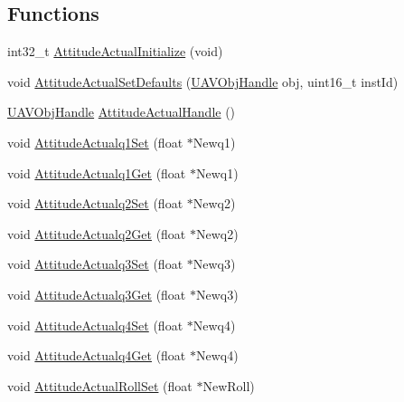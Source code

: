 \subsection*{\-Functions}
\begin{DoxyCompactItemize}
\item 
int32\-\_\-t \hyperlink{group___attitude_actual_ga301430d4316b3957d05b4555e91ddc60}{\-Attitude\-Actual\-Initialize} (void)
\item 
void \hyperlink{group___attitude_actual_ga3aea8c0a7069f3ed70b4fa83478f6055}{\-Attitude\-Actual\-Set\-Defaults} (\hyperlink{targets_2_u_a_v_objects_2inc_2uavobjectmanager_8h_a279053e22be53ce9f895043aaeb91e3b}{\-U\-A\-V\-Obj\-Handle} obj, uint16\-\_\-t inst\-Id)
\item 
\hyperlink{targets_2_u_a_v_objects_2inc_2uavobjectmanager_8h_a279053e22be53ce9f895043aaeb91e3b}{\-U\-A\-V\-Obj\-Handle} \hyperlink{group___attitude_actual_ga527fd19dc9e02ccd389350720589fb74}{\-Attitude\-Actual\-Handle} ()
\item 
void \hyperlink{group___attitude_actual_ga0bc049d283d7efa5c403b442040b554e}{\-Attitude\-Actualq1\-Set} (float $\ast$\-Newq1)
\item 
void \hyperlink{group___attitude_actual_ga604e02158afaf88c678265181ff7bb2b}{\-Attitude\-Actualq1\-Get} (float $\ast$\-Newq1)
\item 
void \hyperlink{group___attitude_actual_gaedb5fc474904a8c0a4554e9ae171b432}{\-Attitude\-Actualq2\-Set} (float $\ast$\-Newq2)
\item 
void \hyperlink{group___attitude_actual_ga6bf914431fb0ef88aa863f5821037426}{\-Attitude\-Actualq2\-Get} (float $\ast$\-Newq2)
\item 
void \hyperlink{group___attitude_actual_ga0de4bb366ff6ec7ea659a46af2034e0d}{\-Attitude\-Actualq3\-Set} (float $\ast$\-Newq3)
\item 
void \hyperlink{group___attitude_actual_gabe32d3ad9f00e774385cb7347292b929}{\-Attitude\-Actualq3\-Get} (float $\ast$\-Newq3)
\item 
void \hyperlink{group___attitude_actual_ga94daf66db74dcfe3afe7f6bd5f4598ba}{\-Attitude\-Actualq4\-Set} (float $\ast$\-Newq4)
\item 
void \hyperlink{group___attitude_actual_ga8cf9c60ce552e95980a48530b5c5d428}{\-Attitude\-Actualq4\-Get} (float $\ast$\-Newq4)
\item 
void \hyperlink{group___attitude_actual_ga297daca7e4a01bba0c16a4916c2c9f8f}{\-Attitude\-Actual\-Roll\-Set} (float $\ast$\-New\-Roll)
\item 

\end{DoxyCompactItemize}
